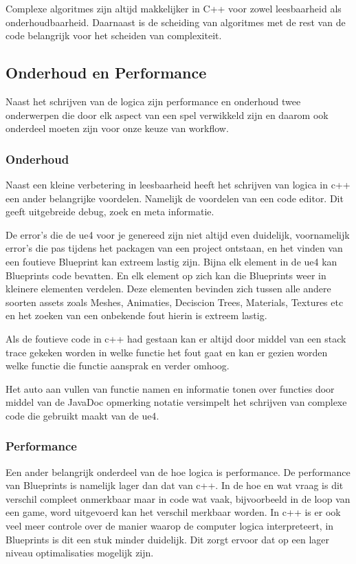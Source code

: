Complexe algoritmes zijn altijd makkelijker in C++ voor zowel leesbaarheid als onderhoudbaarheid. Daarnaast is de scheiding van algoritmes met de rest van de code belangrijk voor het scheiden van complexiteit.

\subsection{Onderhoud en Performance}
Naast het schrijven van de logica zijn performance en onderhoud twee onderwerpen die door elk aspect van een spel verwikkeld zijn en daarom ook onderdeel moeten zijn voor onze keuze van workflow.

\subsubsection{Onderhoud}
Naast een kleine verbetering in leesbaarheid heeft het schrijven van logica in c++ een ander belangrijke voordelen. Namelijk de voordelen van een code editor. Dit geeft uitgebreide debug, zoek en meta informatie. 

De error’s die de \gls{ue4} voor je genereed zijn niet altijd even duidelijk, voornamelijk error’s die pas tijdens het packagen van een project ontstaan, en het vinden van een foutieve Blueprint kan extreem lastig zijn. Bijna elk element in de \gls{ue4} kan Blueprints code bevatten. En elk element op zich kan die Blueprints weer in kleinere elementen verdelen. Deze elementen bevinden zich tussen alle andere soorten assets zoals Meshes, Animaties, Deciscion Trees, Materials, Textures etc en het zoeken van een onbekende fout hierin is extreem lastig.

Als de foutieve code in c++ had gestaan kan er altijd door middel van een stack trace gekeken worden in welke functie het fout gaat en kan er gezien worden welke functie die functie aansprak en verder omhoog. 

Het auto aan vullen van functie namen en informatie tonen over functies door middel van de JavaDoc opmerking notatie versimpelt het schrijven van complexe code die gebruikt maakt van de \gls{ue4}. 

\subsubsection{Performance}
Een ander belangrijk onderdeel van de hoe logica is performance. De performance van Blueprints is namelijk lager dan dat van c++. In de hoe en wat vraag is dit verschil compleet onmerkbaar maar in code wat vaak, bijvoorbeeld in de loop van een game, word uitgevoerd kan het verschil merkbaar worden.
In c++ is er ook veel meer controle over de manier waarop de computer logica interpreteert, in Blueprints is dit een stuk minder duidelijk. Dit zorgt ervoor dat op een lager niveau optimalisaties mogelijk zijn. 

